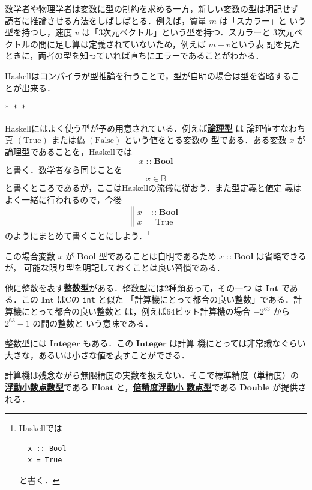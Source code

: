 \documentclass[a5paper,twoside,fleqn,draft]{jsbook}
\newcommand{\separator}{\begin{center}$*$~$*$~$*$\end{center}}
\newcommand{\programminglanguage}[1]{\textsf{#1}}
\newcommand{\clang}{\programminglanguage{C}}
\newcommand{\haskell}{\programminglanguage{Haskell}}
\newcommand{\keyword}[1]{{\underline{\textbf{#1}}}}
\newcommand{\code}[1]{\texttt{#1}}
\newcommand{\mBrace}{\Vert}
\newcommand{\mSpecialConstant}[1]{\textrm{#1}} %
\newcommand{\mFalse}{\mSpecialConstant{False}}
\newcommand{\mTrue}{\mSpecialConstant{True}}
\DeclareMathOperator{\mIn}{{:\!:}}
\newcommand{\mSpecialSet}[1]{\mathbb{#1}} %
\newcommand{\mBSet}{\mSpecialSet{B}}
\newcommand{\mType}[1]{\mathbf{#1}}
\newcommand{\mBoolType}{\mType{Bool}}
\newcommand{\mFloatType}{\mType{Float}}
\newcommand{\mDoubleType}{\mType{Double}}
\newcommand{\mIntType}{\mType{Int}}
\newcommand{\mIntegerType}{\mType{Integer}}
\begin{document}
数学者や物理学者は変数に型の制約を求める一方，新しい変数の型は明記せず
読者に推論させる方法をしばしばとる．例えば，質量 $m$ は「スカラー」と
いう型を持つし，速度 $v$ は「3次元ベクトル」という型を持つ．スカラーと
3次元ベクトルの間に足し算は定義されていないため，例えば $m+v$という表
記を見たときに，両者の型を知っていれば直ちにエラーであることがわかる．

\haskell はコンパイラが型推論を行うことで，型が自明の場合は型を省略することが出来る．

\separator

\haskell にはよく使う型が予め用意されている．例えば\keyword{論理型} は
論理値すなわち真 $(\mTrue)$ または偽 $(\mFalse)$ という値をとる変数の
型である．ある変数 $x$ が論理型であることを，\haskell では
\begin{equation}
x\mIn\mBoolType
\end{equation}
と書く．数学者なら同じことを
\begin{equation}
x\in\mBSet
\end{equation}
と書くところであるが，ここは\haskell の流儀に従おう．また型定義と値定
義はよく一緒に行われるので，今後
\begin{equation}
\left\mBrace\begin{aligned} x&\mIn\mBoolType\\ x&=\mTrue
\end{aligned}\right.
\end{equation}
のようにまとめて書くことにしよう．\footnote{\haskell では
\begin{verbatim}
  x :: Bool
  x = True
\end{verbatim}
と書く．}

この場合変数 $x$ が $\mBoolType$ 型であることは自明であるため $x\mIn\mBoolType$ は省略できるが，
可能な限り型を明記しておくことは良い習慣である．

他に整数を表す\keyword{整数型}がある．整数型には2種類あって，その一つ
は $\mIntType$ である．この $\mIntType$ は\clang の \code{int} と似た
「計算機にとって都合の良い整数」である．計算機にとって都合の良い整数と
は，例えば64ビット計算機の場合 $-2^{63}$ から $2^{63}-1$ の間の整数と
いう意味である．

整数型には $\mIntegerType$ もある．この $\mIntegerType$ は計算
機にとっては非常識なぐらい大きな，あるいは小さな値を表すことができる．

計算機は残念ながら無限精度の実数を扱えない．そこで標準精度（単精度）の
\keyword{浮動小数点数型}である $\mFloatType$ と，\keyword{倍精度浮動小
  数点型}である $\mDoubleType$ が提供される．
\end{document}

